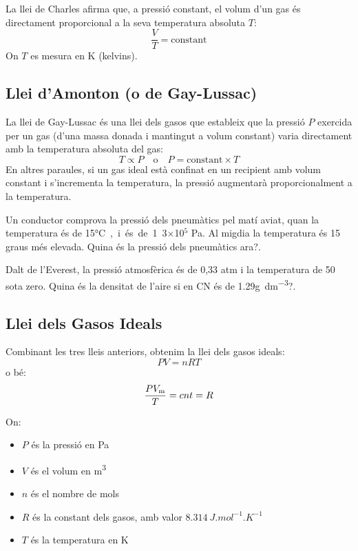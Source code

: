 La llei de Charles afirma que, a pressió constant, el volum d'un gas és directament proporcional a la seva temperatura absoluta \( T \):
\begin{equation}
    \frac{V}{T} = \text{constant}
\end{equation}
On \( T \) es mesura en \si{K} (kelvins).

\subsection{Llei d'Amonton (o de Gay-Lussac)}
La llei de Gay-Lussac és una llei dels gasos que estableix que la pressió \( P \) exercida per un gas (d'una massa donada i mantingut a volum constant) varia directament amb la temperatura absoluta del gas:
\begin{equation}
    T \propto P \quad \text{o} \quad P = \text{constant} \times T
\end{equation}
En altres paraules, si un gas ideal està confinat en un recipient amb volum constant i s'incrementa la temperatura, la pressió augmentarà proporcionalment a la temperatura.

\begin{exr}
    Un conductor comprova la pressió dels pneumàtics pel matí aviat, quan la temperatura és de 15\si\degreeCelsius, i és de 1.3$\times$10$^5$ Pa. Al migdia la temperatura és 15 graus més elevada. Quina és la pressió dels pneumàtics ara?.
    \end{exr}

      
    \begin{exr}
        Dalt de l'Everest, la pressió atmosfèrica és de 0,33 atm i la temperatura de 50 sota zero. Quina és la densitat de l'aire si en CN és de 1.29\si{\gram\per\deci\meter\tothe{3}}?.
        \end{exr}
    

\subsection{Llei dels Gasos Ideals}
Combinant les tres lleis anteriors, obtenim la llei dels gasos ideals:
\begin{equation}
    P V = n R T
\end{equation}
o bé:
\[\frac{P V_{\rm m}}{T}= cnt = R\]

On:
\begin{itemize}
    \item \( P \) és la pressió en \si{Pa}
    \item \( V \) és el volum en \si{m^3}
    \item \( n \) és el nombre de mols
    \item \( R \) és la constant dels gasos, amb valor \( \SI{8.314}{J.mol^{-1}.K^{-1}} \)
    \item \( T \) és la temperatura en \si{K}
\end{itemize}

